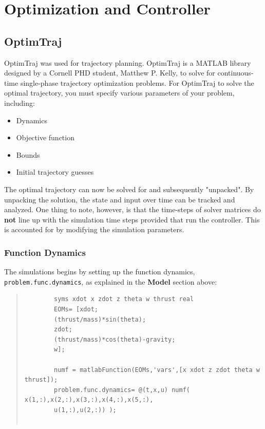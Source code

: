 \documentclass[12pt]{article}
\begin{document}
	
	\section{Optimization and Controller}
	
	
	
	
	\subsection{OptimTraj}
	
	OptimTraj \cite{OptimTraj} was used for trajectory planning. OptimTraj is a MATLAB library designed by a Cornell PHD student, Matthew P. Kelly, to solve for continuous-time single-phase trajectory optimization problems. For OptimTraj to solve the optimal trajectory, you must specify various parameters of your problem, including:
	\begin{itemize}
		\item Dynamics
		\item Objective function
		\item Bounds
		\item Initial trajectory guesses
	\end{itemize}
	
	The optimal trajectory can now be solved for and subsequently "unpacked". By unpacking the solution, the state and input over time can be tracked and analyzed. One thing to note, however, is that the time-steps of solver matrices do \textbf{not} line up with the simulation time steps provided that run the controller. This is accounted for by modifying the simulation parameters. 
	\subsubsection{Function Dynamics}
	The simulations begins by setting up the function dynamics, \lstinline!problem.func.dynamics!, as explained in the \textbf{Model} section above: 
	\begin{quote}
		\begin{lstlisting}
		syms xdot x zdot z theta w thrust real
		EOMs= [xdot;
		(thrust/mass)*sin(theta);
		zdot;
		(thrust/mass)*cos(theta)-gravity;
		w];
		
		numf = matlabFunction(EOMs,'vars',[x xdot z zdot theta w thrust]);
		problem.func.dynamics= @(t,x,u) numf( x(1,:),x(2,:),x(3,:),x(4,:),x(5,:),
		u(1,:),u(2,:)) );
		
		\end{lstlisting}
	\end{quote}
	
\end{document}
